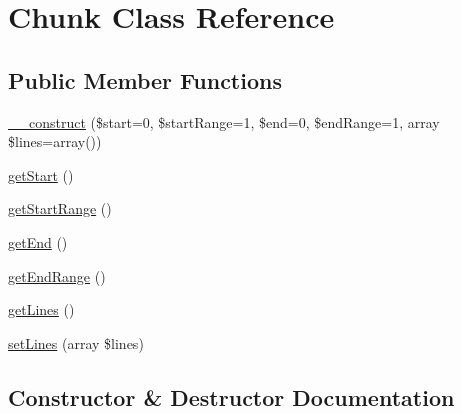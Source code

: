 \hypertarget{class_sebastian_bergmann_1_1_diff_1_1_chunk}{}\section{Chunk Class Reference}
\label{class_sebastian_bergmann_1_1_diff_1_1_chunk}
\subsection*{Public Member Functions}
\begin{DoxyCompactItemize}
\item 
\mbox{\hyperlink{class_sebastian_bergmann_1_1_diff_1_1_chunk_ae15669386ce533b1f77337495ed635cc}{\+\_\+\+\_\+construct}} (\$start=0, \$start\+Range=1, \$end=0, \$end\+Range=1, array \$lines=array())
\item 
\mbox{\hyperlink{class_sebastian_bergmann_1_1_diff_1_1_chunk_aa86e59bfce83f0dbfcd14a0c2a83e98e}{get\+Start}} ()
\item 
\mbox{\hyperlink{class_sebastian_bergmann_1_1_diff_1_1_chunk_a2863911a7e5034b92ad8fe53df371da2}{get\+Start\+Range}} ()
\item 
\mbox{\hyperlink{class_sebastian_bergmann_1_1_diff_1_1_chunk_a000b799500c1a9b8f1bd60c204191563}{get\+End}} ()
\item 
\mbox{\hyperlink{class_sebastian_bergmann_1_1_diff_1_1_chunk_a0a7286c68cf530fa063e9593d2854bf2}{get\+End\+Range}} ()
\item 
\mbox{\hyperlink{class_sebastian_bergmann_1_1_diff_1_1_chunk_a0136c01a67c37f34074107a9d358c134}{get\+Lines}} ()
\item 
\mbox{\hyperlink{class_sebastian_bergmann_1_1_diff_1_1_chunk_a2dbb7ff411eebe139624f2832f334bf0}{set\+Lines}} (array \$lines)
\end{DoxyCompactItemize}


\subsection{Constructor \& Destructor Documentation}
\mbox{\label{class_sebastian_bergmann_1_1_diff_1_1_chunk_ae15669386ce533b1f77337495ed635cc}} 
